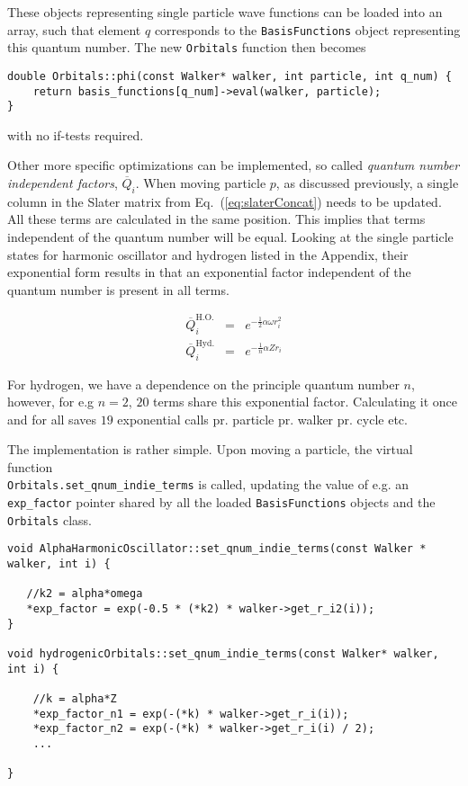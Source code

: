 These objects representing single particle wave functions can be loaded into an array, such that element $q$ corresponds to the \verb+BasisFunctions+ object representing this quantum number. The new \verb+Orbitals+ function then becomes

\begin{lstlisting}
double Orbitals::phi(const Walker* walker, int particle, int q_num) {
    return basis_functions[q_num]->eval(walker, particle);
}
\end{lstlisting}

with no if-tests required.

Other more specific optimizations can be implemented, so called \textit{quantum number independent factors}, $\overline{Q}_i$. When moving particle $p$, as discussed previously, a single column in the Slater matrix from Eq.~(\ref{eq:slaterConcat}) needs to be updated. All these terms are calculated in the same position. This implies that terms independent of the quantum number will be equal. Looking at the single particle states for harmonic oscillator and hydrogen listed in the Appendix, their exponential form results in that an exponential factor independent of the quantum number is present in all terms.

\begin{eqnarray}
\overline{Q}_i^\mathrm{H.O.} &=& e^{-\frac{1}{2}\alpha\omega r_i^2} \\
 \overline{Q}_i^\mathrm{Hyd.} &=& e^{-\frac{1}{n}\alpha Z r_i}
\end{eqnarray}

For hydrogen, we have a dependence on the principle quantum number $n$, however, for e.g $n=2$,  $20$ terms share this exponential factor. Calculating it once and for all saves $19$ exponential calls pr. particle pr. walker pr. cycle etc.

The implementation is rather simple. Upon moving a particle, the virtual function \\\verb+Orbitals.set_qnum_indie_terms+ is called, updating the value of e.g. an \verb+exp_factor+ pointer shared by all the loaded \verb+BasisFunctions+ objects and the \verb+Orbitals+ class.

\begin{lstlisting}
void AlphaHarmonicOscillator::set_qnum_indie_terms(const Walker * walker, int i) {
   
   //k2 = alpha*omega 
   *exp_factor = exp(-0.5 * (*k2) * walker->get_r_i2(i));
}

void hydrogenicOrbitals::set_qnum_indie_terms(const Walker* walker, int i) {

    //k = alpha*Z
    *exp_factor_n1 = exp(-(*k) * walker->get_r_i(i));
    *exp_factor_n2 = exp(-(*k) * walker->get_r_i(i) / 2);
    ...

}
\end{lstlisting}

